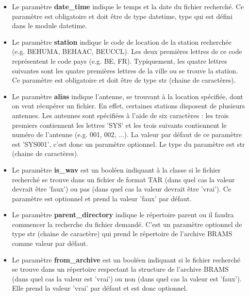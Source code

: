 \documentclass[11pt]{article}
\begin{document}
\begin{itemize}
    \item Le paramètre \textbf{date\_time} indique le temps et la date du fichier recherché.
          Ce paramètre est obligatoire et doit être de type datetime, type qui est défini dans le module datetime.
    \item Le paramètre \textbf{station} indique le code de location de la station recherchée (e.g. BEHUMA, BEHAAC, BEUCCL).
          Les deux premières lettres de ce code représentent le code pays (e.g. BE, FR).
          Typiquement, les quatre lettres suivantes sont les quatre premières lettres de la ville ou se trouve la station.
          Ce paramètre est obligatoire et doit être de type str (chaine de caractères).
    \item Le paramètre \textbf{alias} indique l'antenne, se trouvant à la location spécifiée, dont on veut récupérer un fichier.
          En effet, certaines stations disposent de plusieurs antennes.
          Les antennes sont spécifiées à l'aide de six caractères : les trois premiers contiennent les lettres 'SYS' et les trois suivants contiennent le numéro de l'antenne (e.g. 001, 002, ...).
          La valeur par défaut de ce paramètre est 'SYS001', c'est donc un paramètre optionnel.
          Le type du paramètre est str (chaine de caractères).
    \item Le paramètre \textbf{is\_wav} est un booléen indiquant à la classe si le fichier recherché se trouve dans un fichier de format TAR (dans quel cas la valeur devrait être 'faux') ou pas (dans quel cas la valeur devrait être 'vrai').
          Ce paramètre est optionnel et prend la valeur 'faux' par défaut.
    \item Le paramètre \textbf{parent\_directory} indique le répertoire parent ou il faudra commencer la recherche du fichier demandé.
          C'est un paramètre optionnel de type str (chaine de caractère) qui prend le répertoire de l'archive BRAMS comme valeur par défaut.
    \item Le paramètre \textbf{from\_archive} est un booléen indiquant si le fichier recherché se trouve dans un répertoire respectant la structure de l'archive BRAMS (dans quel cas la valeur est 'vrai') ou non (dans quel cas la valeur est 'faux').
          Elle prend la valeur 'vrai' par défaut et est donc optionnel.
\end{itemize}
\end{document}
